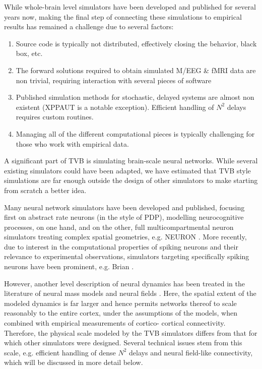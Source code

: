 While whole-brain level simulators have been developed and published for
several years now, making the final step of connecting these simulations to
empirical results has remained a challenge due to several factors:

\begin{enumerate}

	\item Source code is typically not distributed, effectively closing
        the behavior, black box, etc. 

	\item The forward solutions required to obtain simulated M/EEG \& fMRI
	data are non trivial, requiring interaction with several pieces of software

	\item Published simulation methods for stochastic, delayed systems 
		are almost non existent (XPPAUT \cite{XPPAUT} is a notable exception).
		Efficient handling of $N^2$ delays requires custom routines.

	\item Managing all of the different computational pieces is typically
	challenging for those who work with empirical data.

\end{enumerate}

A significant part of TVB is simulating brain-scale neural networks. While
several existing simulators could have been adapted, we have estimated that
TVB style simulations are far enough outside the design of other simulators to
make starting from scratch a better idea.

Many neural network simulators have been developed and published, focusing
first on abstract rate neurons (in the style of PDP), modelling neurocognitive
processes, on one hand, and on the other, full multicompartmental neuron
simulators treating complex spatial geometries, e.g. NEURON \cite{Hines_2001}.
More recently, due to interest in the computational properties of spiking 
neurons and their relevance to experimental observations, simulators targeting
specifically spiking neurons have been prominent, e.g. Brian 
\cite{Goodman_2009}.

However, another level description of neural dynamics has been treated
in the literature of neural mass models and neural fields 
\cite{Deco_2008a, Coombes_2010}. Here, the spatial
extent of the modeled dynamics is far larger and hence permits networks 
thereof to scale reasonably to the entire cortex, under the assumptions 
of the models, when combined with empirical measurements of cortico-
cortical connectivity. Therefore, the physical scale modeled by the TVB
simulators differs from that for which other simulators were designed.
Several technical issues stem from this scale, e.g. efficient handling
of dense $N^2$ delays and neural field-like connectivity, which will be
discussed in more detail below. 

